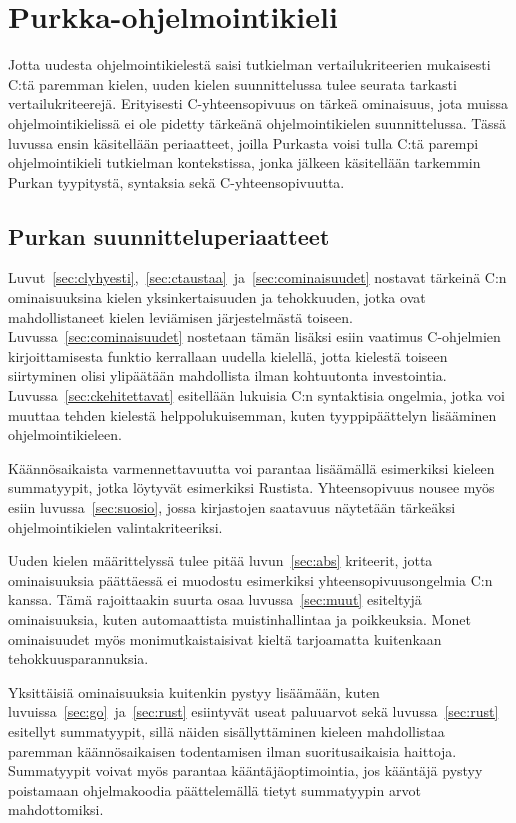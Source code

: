 \section{Purkka-ohjelmointikieli}
\label{sec:purkka}

Jotta uudesta ohjelmointikielestä saisi tutkielman vertailukriteerien
mukaisesti C:tä paremman kielen, uuden kielen suunnittelussa tulee seurata
tarkasti vertailukriteerejä. Erityisesti C-yhteensopivuus on tärkeä ominaisuus,
jota muissa ohjelmointikielissä ei ole pidetty tärkeänä ohjelmointikielen
suunnittelussa. Tässä luvussa ensin käsitellään periaatteet, joilla Purkasta
voisi tulla C:tä parempi ohjelmointikieli tutkielman kontekstissa, jonka
jälkeen käsitellään tarkemmin Purkan tyypitystä, syntaksia sekä
C-yhteensopivuutta.

\subsection{Purkan suunnitteluperiaatteet}

Luvut~\ref{sec:clyhyesti},~\ref{sec:ctaustaa}~ja~\ref{sec:cominaisuudet}
nostavat tärkeinä C:n ominaisuuksina kielen yksinkertaisuuden ja tehokkuuden,
jotka ovat mahdollistaneet kielen leviämisen järjestelmästä toiseen.
Luvussa~\ref{sec:cominaisuudet} nostetaan tämän lisäksi esiin vaatimus
C-ohjelmien kirjoittamisesta funktio kerrallaan uudella kielellä, jotta
kielestä toiseen siirtyminen olisi ylipäätään mahdollista ilman kohtuutonta
investointia. Luvussa~\ref{sec:ckehitettavat} esitellään lukuisia C:n
syntaktisia ongelmia, jotka voi muuttaa tehden kielestä helppolukuisemman,
kuten tyyppipäättelyn lisääminen ohjelmointikieleen.

Käännösaikaista varmennettavuutta voi parantaa lisäämällä esimerkiksi
kieleen summatyypit, jotka löytyvät esimerkiksi Rustista. Yhteensopivuus nousee
myös esiin luvussa~\ref{sec:suosio}, jossa kirjastojen saatavuus näytetään
tärkeäksi ohjelmointikielen valintakriteeriksi.

Uuden kielen määrittelyssä tulee pitää luvun~\ref{sec:abs} kriteerit, jotta
ominaisuuksia päättäessä ei muodostu esimerkiksi yhteensopivuusongelmia C:n
kanssa. Tämä rajoittaakin suurta osaa luvussa~\ref{sec:muut} esiteltyjä
ominaisuuksia, kuten automaattista muistinhallintaa ja poikkeuksia. Monet
ominaisuudet myös monimutkaistaisivat kieltä tarjoamatta kuitenkaan
tehokkuusparannuksia.

Yksittäisiä ominaisuuksia kuitenkin pystyy lisäämään,
kuten luvuissa~\ref{sec:go}~ja~\ref{sec:rust} esiintyvät useat paluuarvot sekä
luvussa~\ref{sec:rust} esitellyt summatyypit, sillä näiden sisällyttäminen
kieleen mahdollistaa paremman käännösaikaisen todentamisen ilman
suoritusaikaisia haittoja. Summatyypit voivat myös parantaa
kääntäjäoptimointia, jos kääntäjä pystyy poistamaan ohjelmakoodia päättelemällä
tietyt summatyypin arvot mahdottomiksi.

